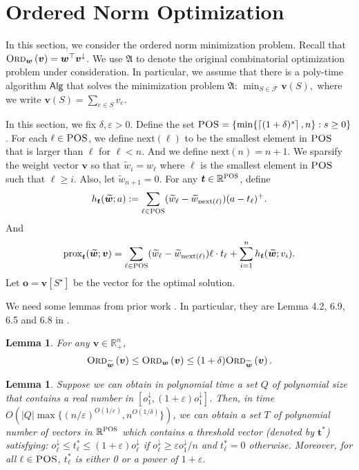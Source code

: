 \documentclass[11pt,a4paper]{article} \usepackage{enumitem}
\newcommand{\ceil}[1]{\left\lceil #1 \right\rceil}
\newcommand{\calF}{\mathcal{F}}
\newcommand{\ww}{\boldsymbol{\widetilde{w}}}
\newcommand{\da}{\downarrow}
\newcommand{\boldv}{\boldsymbol{v}}
\newcommand{\boldw}{\boldsymbol{w}}
\newcommand{\boldt}{\boldsymbol{t}}
\newcommand{\myproblem}{\mathfrak{A}}
\newcommand{\Algo}{\mathsf{Alg}}
\newcommand{\ordered}[2]{\textsc{Ord}_{#1}\left(#2\right)}
\newcommand{\R}{\mathbb{R}}
\newcommand{\Rpos}{\mathbb{R}_+}
\newcommand{\POS}{\textsc{POS}}
\newtheorem{lemma}[theorem]{Lemma}
\theoremstyle{definition}
\begin{document}
\section{Ordered Norm Optimization} \label{sec:ordered-norm}


In this section, we consider the ordered norm minimization problem.
Recall that $\ordered{\boldw}{\boldv}=\boldw^\top\boldv^\da$.
We use $\myproblem$ to denote the original combinatorial optimization problem
under consideration.
In particular, we assume that there is a poly-time algorithm $\Algo$ 
that solves the minimization problem $\myproblem$:
$
\min_{S\in \calF} \boldv(S), 
$
where we write $\boldv(S)=\sum_{e\in S}v_e$.

In this section, we fix $\delta,\varepsilon>0$.
Define the set $\POS=\{\min\{\ceil{(1+\delta)^s},n\}:s\geq 0\}$.
For each $\ell\in\POS$, we define $\text{next}(\ell)$ to be the smallest element in $\POS$ that is larger than $\ell$ for $\ell<n$.
And we define $\text{next}(n)=n+1$.
We sparsify the weight vector $\boldv$ so that $\widetilde{w}_i=w_\ell$ where $\ell$ is the smallest element in $\POS$ such that $\ell\ge i$.
Also, let $\widetilde{w}_{n+1}=0$.
For any $\boldt\in \R^{\POS}$, define
$$h_{\boldt}(\ww;a):=\sum_{\ell\in\POS}(\widetilde{w}_\ell-\widetilde{w}_{\text{next}(\ell)})(a-t_\ell)^+.$$
And
$$\text{prox}_{\boldt}(\ww;\boldv)=\sum_{\ell\in\POS}(\widetilde{w}_\ell-\widetilde{w}_{\text{next}(\ell)})\ell\cdot t_\ell+\sum_{i=1}^n h_{\boldt}(\ww;v_i).$$
Let $\boldsymbol{o}=\boldv[S^\star]$ be the vector for the optimal solution.

We need some lemmas from prior work \cite{chakrabarty2019approximation}.
In particular, they are Lemma 4.2, 6.9, 6.5 and 6.8 in \cite{chakrabarty2019approximation}.

\begin{lemma}
\label{lm:C.1}
For any $\boldv\in\Rpos^n$, 
$$\ordered{\widetilde{\boldw}}{\boldv}\leq \ordered{\boldw}{\boldv}\leq 
(1+\delta)\ordered{\widetilde{\boldw}}{\boldv}.$$
\end{lemma}

\begin{lemma}
Suppose we can obtain in polynomial time a set $Q$ of polynomial size that contains a real number in $[o_1^\da,(1+\varepsilon)o_1^\da]$.
Then, in time $O\left(|Q|\max\{(n/\varepsilon)^{O(1/\varepsilon)},n^{O(1/\delta)}\}\right)$, we can obtain a set $T$ of polynomial number of vectors in $\R^{\POS}$ which contains a threshold vector (denoted by $\boldsymbol{t}^*$) satisfying:
$o_\ell^\da\leq t^*_\ell\leq (1+\varepsilon)o_\ell^\da$ if $o_\ell^\da\geq \varepsilon o_1^\da/n$ and $t^*_\ell=0$ otherwise.
Moreover, for all $\ell\in \POS$,
$t^*_\ell$ is either 0 or a power of $1+\varepsilon$.
\end{lemma}
\end{document}
